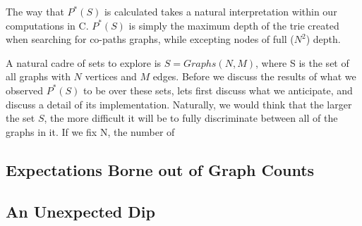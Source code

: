 The way that  $P^*(S)$ is calculated takes a natural interpretation within our computations in C. 
 $P^*(S)$ is simply the maximum depth of the trie created when searching for co-paths graphs, while excepting nodes of full ($N^2$) depth.

A natural cadre of sets to explore is $S = Graphs(N, M)$, where S is the set of all graphs with $N$ vertices and $M$ edges.
Before we discuss the results of what we observed $P^*(S)$ to be over these sets, lets first discuss what we anticipate, and discuss a detail of its implementation.
Naturally, we would think that the larger the set $S$, the more difficult it will be to fully discriminate between all of the graphs in it.
If we fix N, the number of 

\subsection{Expectations Borne out of Graph Counts}
\subsection{An Unexpected Dip}